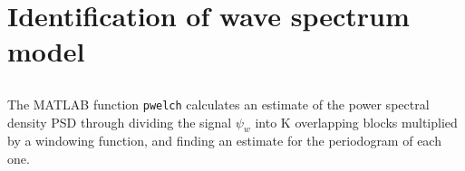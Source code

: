 \section{Identification of wave spectrum model}
\subsection{}
The MATLAB function \texttt{pwelch} calculates an estimate of the power spectral density PSD through dividing the signal $\psi_w$ into K overlapping blocks multiplied by a windowing function, and finding an estimate for the periodogram of each one.